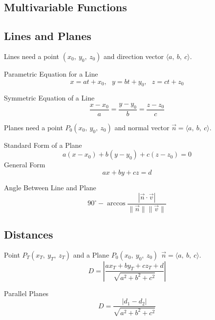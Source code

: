 \documentclass[12pt]{article}
\numberwithin{equation}{subsection}
\newcommand{\vecp}[1]{\langle #1 \rangle}
\newcommand{\magp}[1]{\| #1 \|}
\newcommand{\absp}[1]{\left\vert #1 \right\vert}
\begin{document}
\begin{flushleft}
\section{Multivariable Functions}
\subsection{Lines and Planes}
Lines need a point $(x_{0},\ y_{0},\ z_{0})$ and direction vector $\vecp{a,\ b,\ c}$.\\
\bigskip

Parametric Equation for a Line
\begin{equation}
x=at+x_{0},\ \ \ y=bt+y_{0},\ \ \ z=ct+z_{0}
\end{equation}

Symmetric Equation of a Line
\begin{equation}
\frac{x-x_{0}}{a}=\frac{y-y_{0}}{b}=\frac{z-z_{0}}{c}
\end{equation}

\bigskip
\bigskip


Planes need a point $P_{0}(x_{0},\ y_{0},\ z_{0})$ and normal vector $\vec{n}=\vecp{a,\ b,\ c}$.\\
\bigskip

Standard Form of a Plane
\begin{equation}
a(x-x_{0})+b(y-y_{0})+c(z-z_{0})=0
\end{equation}
General Form
\begin{equation}
ax+by+cz=d
\end{equation}

Angle Between Line and Plane
\begin{equation}
90^{\circ}-\arccos{\frac{\absp{\vec{n} \cdot \vec{v}}}{\magp{\vec{n}} \magp{\vec{v}}}}
\end{equation}

\subsection{Distances}
Point $P_{T}(x_{T},\ y_{T},\ z_{T})$ and a Plane $P_{0}(x_{0},\ y_{0},\ z_{0})\ \ \vec{n}=\vecp{a,\ b,\ c}$.
\begin{equation}
D=\left\vert \frac{ax_{T}+by_{T}+cz_{T}+d}{\sqrt{a^{2}+b^{2}+c^{2}}}  \right\vert
\end{equation}

Parallel Planes
\begin{equation}
D= \frac{\absp{d_{1}-d_{2}}}{\sqrt{a^{2}+b^{2}+c^{2}}}  
\end{equation}


\end{flushleft}
\end{document}
